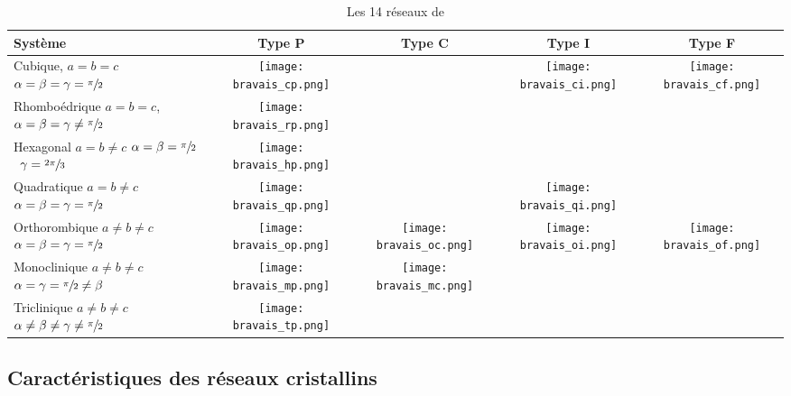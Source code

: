 \begin{table}
    \footnotesize
    \begin{tabulary}{\linewidth}{|p{2.5cm}|c|c|c|c|}
        \hline \bf Système & Type P & Type C & Type I & Type F \\\hline
        Cubique, \mbox{$a = b = c$}
        \mbox{$\alpha = \beta = \gamma = \sfrac{\pi}{2}$} &
        \texttt{[image: bravais\_cp.png]} & & 
        \texttt{[image: bravais\_ci.png]} &
        \texttt{[image: bravais\_cf.png]} 
        \\
        \hline Rhomboédrique $a = b = c$,
        \mbox{$\alpha = \beta = \gamma \neq \sfrac{\pi}{2}$}&
        \texttt{[image: bravais\_rp.png]} & & &
        \\
        \hline Hexagonal $a = b \neq c$
        \mbox{$\alpha = \beta = \sfrac{\pi}{2}$ $\gamma = \sfrac{2\pi}{3}$} &
        \texttt{[image: bravais\_hp.png]} & & &
        \\
        \hline Quadratique $a = b \neq c$
        \mbox{$\alpha = \beta = \gamma = \sfrac{\pi}{2}$} &
        \texttt{[image: bravais\_qp.png]} & &
        \texttt{[image: bravais\_qi.png]} &
        \\
        \hline Orthorombique $a \neq b \neq c$
        \mbox{$\alpha = \beta = \gamma = \sfrac{\pi}{2}$} &
        \texttt{[image: bravais\_op.png]} &
        \texttt{[image: bravais\_oc.png]} &
        \texttt{[image: bravais\_oi.png]} &
        \texttt{[image: bravais\_of.png]}
        \\
        \hline Monoclinique $a \neq b \neq c$
        \mbox{$\alpha=\gamma=\sfrac{\pi}{2} \neq \beta$}
        &
        \texttt{[image: bravais\_mp.png]} &
        \texttt{[image: bravais\_mc.png]} & &
        \\
        \hline Triclinique $a \neq b \neq c$
        \mbox{$\alpha \neq \beta \neq \gamma \neq \sfrac{\pi}{2}$} &
        \texttt{[image: bravais\_tp.png]} & & &
        \\
        \hline
    \end{tabulary}
    \caption{Les 14 réseaux de }\label{tab:bravais}
\end{table}

\subsection{Caractéristiques des réseaux cristallins}

